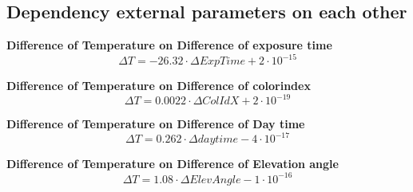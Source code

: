 \documentclass  [
  paper    = a4,
  BCOR     = 10mm,
  twoside,
  fontsize = 12pt,
  fleqn,
  toc      = bibnumbered,
  toc      = listofnumbered,
  numbers  = noendperiod,
  headings = normal,
  listof   = leveldown,
  version  = 3.03
]                                       {scrreprt}
\begin{document}
\begin{appendix}
\begin{figure}
		\caption{}
		\label{fig:I2J8548}
		\end{figure}
	\subsection*{Dependency external parameters on each other}
			\textbf{Difference of Temperature on  Difference of exposure time}
	\begin{equation}
	\Delta T =  -26.32\cdot \Delta ExpTime + 2\cdot 10^{-15}
	\end{equation}
	
	\textbf{Difference of Temperature on  Difference of colorindex}
	\begin{equation}
	\Delta T = 0.0022\cdot \Delta ColIdX +2\cdot 10^{-19}
	\end{equation}
	
	\textbf{Difference of Temperature on  Difference of Day time}
	\begin{equation}
	\Delta T =0.262\cdot \Delta daytime -4\cdot 10^{-17}
	\end{equation}
	
	\textbf{Difference of Temperature on  Difference of Elevation angle}
	\begin{equation}
	\Delta T =1.08\cdot \Delta Elev Angle -1\cdot 10^{-16}
	\end{equation}
	

\end{appendix}
\end{document}
